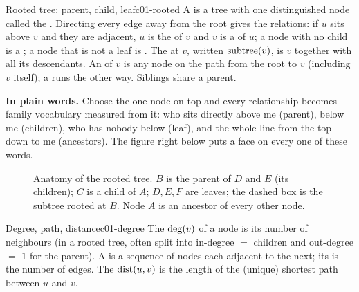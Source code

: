 \begin{definition}{Rooted tree: parent, child, leaf}{c01-rooted}
A  is a tree with one distinguished node called the .
Directing every edge away from the root gives the relations: if $u$ sits above $v$
and they are adjacent, $u$ is the  of $v$ and $v$ is a  of
$u$; a node with no child is a ; a node that is not a leaf is
. The  at $v$, written $\operatorname{subtree}(v)$, is $v$ together
with all its descendants. An  of $v$ is any node on the path from the
root to $v$ (including $v$ itself); a  runs the other way. Siblings
share a parent.
\end{definition}

\noindent\textbf{In plain words.} Choose the one node on top and every relationship
becomes family vocabulary measured from it: who sits directly above me (parent), below
me (children), who has nobody below (leaf), and the whole line from the top down to me
(ancestors). The figure right below puts a face on every one of these words.

\begin{figure}[H]
\centering
{}
\caption{Anatomy of the rooted tree. $B$ is the parent of $D$ and $E$ (its children);
$C$ is a child of $A$; $D,E,F$ are leaves; the dashed box is the subtree rooted at
$B$. Node $A$ is an ancestor of every other node.}\label{fig:c01-anatomy}
\end{figure}

\begin{definition}{Degree, path, distance}{c01-degree}
The  $\operatorname{deg}(v)$ of a node is its number of neighbours (in a rooted tree,
often split into in-degree $=$ children and out-degree $=$ $1$ for the parent). A
 is a sequence of nodes each adjacent to the next; its  is the
number of edges. The  $\operatorname{dist}(u,v)$ is the length of the (unique) shortest
path between $u$ and $v$.
\end{definition}

